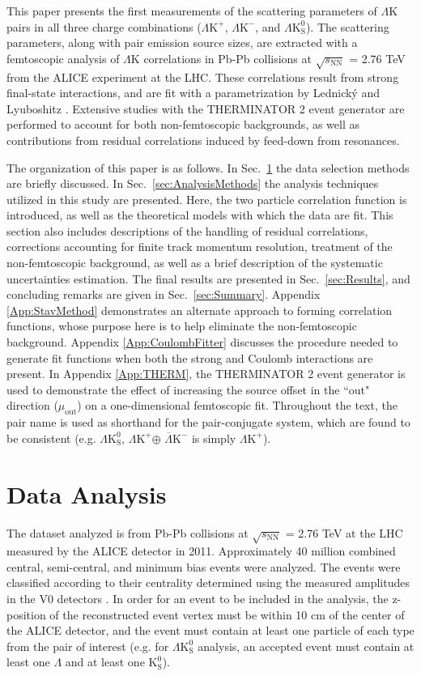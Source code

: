 \documentclass[ALICE,manyauthors]{cernphprep}
\newcommand{\Lam}{$\Lambda$\xspace}
\newcommand{\Ks}{$\mathrm{K^{0}_{S}}$\xspace}
\newcommand{\LamK}{$\Lambda$K\xspace}
\newcommand{\LamKchP}{$\Lambda\mathrm{K^{+}}$\xspace}
\newcommand{\ALamKchM}{$\overline{\Lambda}\mathrm{K^{-}}$\xspace}
\newcommand{\LamKchM}{$\Lambda\mathrm{K^{-}}$\xspace}
\newcommand{\LamKs}{$\Lambda\mathrm{K^{0}_{S}}$\xspace}
\begin{document}
This paper presents the first measurements of the scattering parameters of \LamK pairs in all three charge combinations (\LamKchP, \LamKchM, and \LamKs).
The scattering parameters, along with pair emission source sizes, are extracted with a femtoscopic analysis of \LamK correlations in Pb-Pb collisions at $\sqrt{s_{\mathrm{NN}}}$ = 2.76 TeV from the ALICE experiment at the LHC.  
These correlations result from strong final-state interactions, and are fit with a parametrization by Lednick\'y and Lyuboshitz \cite{Lednicky:82}.  
Extensive studies with the THERMINATOR 2 event generator are performed to account for both non-femtoscopic backgrounds, as well as contributions from residual correlations induced by feed-down from resonances.

The organization of this paper is as follows.  
In Sec.\ \ref{sec:DataAnalysis} the data selection methods are briefly discussed.
In Sec.\ \ref{sec:AnalysisMethods} the analysis techniques utilized in this study are presented.  
Here, the two particle correlation function is introduced, as well as the theoretical models with which the data are fit.  
This section also includes descriptions of the handling of residual correlations, corrections accounting for finite track momentum resolution, treatment of the non-femtoscopic background, as well as a brief description of the systematic uncertainties estimation.  
The final results are presented in Sec.\ \ref{sec:Results}, and concluding remarks are given in Sec.\ \ref{sec:Summary}.
Appendix \ref{App:StavMethod} demonstrates an alternate approach to forming correlation functions, whose purpose here is to help eliminate the non-femtoscopic background.
Appendix \ref{App:CoulombFitter} discusses the procedure needed to generate fit functions when both the strong and Coulomb interactions are present.
In Appendix \ref{App:THERM}, the THERMINATOR 2 event generator is used to demonstrate the effect of increasing the source offset in the ``out" direction ($\mu_{\mathrm{out}}$) on a one-dimensional femtoscopic fit.
Throughout the text, the pair name is used as shorthand for the pair-conjugate system, which are found to be consistent (e.g. \LamKs, \LamKchP $\oplus$ \ALamKchM is simply \LamKchP).

\section{Data Analysis}
\label{sec:DataAnalysis}

The dataset analyzed is from Pb-Pb collisions at $\sqrt{s_{\mathrm{NN}}}$ = 2.76 TeV at the LHC measured by the ALICE detector \cite{1748-0221-3-08-S08002} in 2011.
Approximately 40 million combined central, semi-central, and minimum bias events were analyzed.
The events were classified according to their centrality determined using the measured amplitudes in the V0 detectors \cite{Abelev:2013qoq}.  
In order for an event to be included in the analysis, the z-position of the reconstructed event vertex must be within 10 cm of the center of the ALICE detector, and the event must contain at least one particle of each type from the pair of interest (e.g. for \LamKs analysis, an accepted event must contain at least one \Lam and at least one \Ks). 
\end{document}
